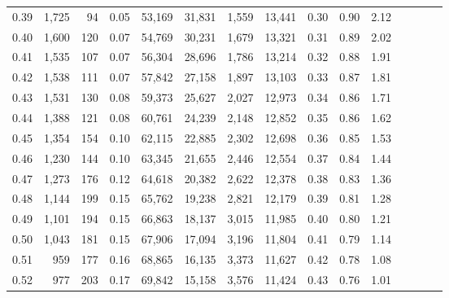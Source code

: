 \begin{tabular}{rrrcrrrrrrrrrrr}
0.39 &  1,725 &   94 &                                       0.05 &  53,169 &  31,831 &   1,559 &  13,441 &  0.30 &  0.90 &                         2.12 \\
0.40 &  1,600 &  120 &                                       0.07 &  54,769 &  30,231 &   1,679 &  13,321 &  0.31 &  0.89 &                         2.02 \\
0.41 &  1,535 &  107 &                                       0.07 &  56,304 &  28,696 &   1,786 &  13,214 &  0.32 &  0.88 &                         1.91 \\
0.42 &  1,538 &  111 &                                       0.07 &  57,842 &  27,158 &   1,897 &  13,103 &  0.33 &  0.87 &                         1.81 \\
0.43 &  1,531 &  130 &                                       0.08 &  59,373 &  25,627 &   2,027 &  12,973 &  0.34 &  0.86 &                         1.71 \\
0.44 &  1,388 &  121 &                                       0.08 &  60,761 &  24,239 &   2,148 &  12,852 &  0.35 &  0.86 &                         1.62 \\
0.45 &  1,354 &  154 &                                       0.10 &  62,115 &  22,885 &   2,302 &  12,698 &  0.36 &  0.85 &                         1.53 \\
0.46 &  1,230 &  144 &                                       0.10 &  63,345 &  21,655 &   2,446 &  12,554 &  0.37 &  0.84 &                         1.44 \\
0.47 &  1,273 &  176 &                                       0.12 &  64,618 &  20,382 &   2,622 &  12,378 &  0.38 &  0.83 &                         1.36 \\
0.48 &  1,144 &  199 &                                       0.15 &  65,762 &  19,238 &   2,821 &  12,179 &  0.39 &  0.81 &                         1.28 \\
0.49 &  1,101 &  194 &                                       0.15 &  66,863 &  18,137 &   3,015 &  11,985 &  0.40 &  0.80 &                         1.21 \\
0.50 &  1,043 &  181 &                                       0.15 &  67,906 &  17,094 &   3,196 &  11,804 &  0.41 &  0.79 &                         1.14 \\
0.51 &    959 &  177 &                                       0.16 &  68,865 &  16,135 &   3,373 &  11,627 &  0.42 &  0.78 &                         1.08 \\
0.52 &    977 &  203 &                                       0.17 &  69,842 &  15,158 &   3,576 &  11,424 &  0.43 &  0.76 &                         1.01 \\

\end{tabular}
